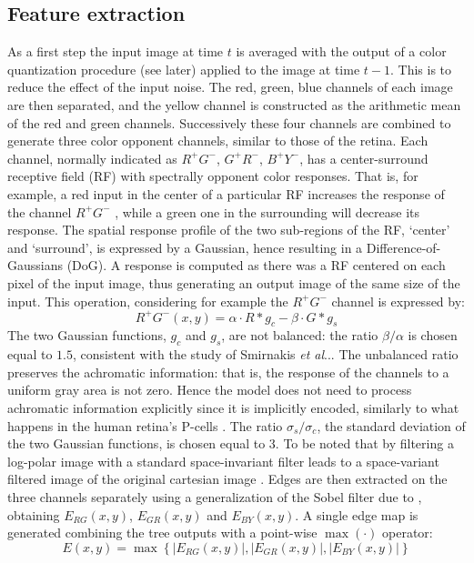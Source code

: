 \documentclass{llncs}
\makeatletter
\DeclareRobustCommand\onedot{\futurelet\@let@token\@onedot}
\def\@onedot{\ifx\@let@token.\else.\null\fi\xspace}
\def\etal{\emph{et al}\onedot}
\makeatother
\begin{document}
\subsection{Feature extraction}
As a first step the input image at time $t$ is averaged
with the output of a color quantization procedure (see
later) applied to the image at time $t-1$. This is to reduce
the effect of the input noise. The red, green, blue
channels of each image are then separated, and the
yellow channel is constructed as the arithmetic mean
of the red and green channels. Successively these four
channels are combined to generate three color
opponent channels, similar to those of the retina. Each
channel, normally indicated as $R^+G^-$, $G^+R^-$, $B^+ Y^-$,
has a center-surround receptive field (RF) with
spectrally opponent color responses. That is, for
example, a red input in the center of a particular RF
increases the response of the channel $R^+G^-$ , while a
green one in the surrounding will decrease its
response. The spatial response profile of the two sub-regions
of the RF, `center' and `surround', is expressed by a Gaussian,
hence resulting in a Difference-of-Gaussians (DoG).
A response is computed as there was a RF centered on
each pixel of the input image, thus generating an
output image of the same size of the input. This
operation, considering for example the $R^+G^-$ channel
is expressed by:
\begin{equation}
	R^+G^-(x,y)=\alpha \cdot R * g_c - \beta \cdot G * g_s
	\label{eq:dog}
\end{equation}
The two Gaussian functions, $g_c$ and $g_s$, are not
balanced: the ratio $\beta / \alpha$ is chosen equal to $1.5$,
consistent with the study of Smirnakis \etal \cite{SmirnakisBWBM97}. The
unbalanced ratio preserves the achromatic information:
that is, the response of the channels to a uniform gray
area is not zero. Hence the model does not need to
process achromatic information explicitly since it is
implicitly encoded, similarly to what happens in the
human retina's P-cells \cite{Billock95}. The ratio $\sigma_s / \sigma_c$, the
standard deviation of the two Gaussian functions, is
chosen equal to 3. To be noted that by filtering a log-polar
image with a standard space-invariant filter leads
to a space-variant filtered image of the original
cartesian image \cite{MallotSG90}.
Edges are then extracted on the three channels
separately using a generalization of the Sobel filter due
to \cite{LiYYY03}, obtaining $E_{RG}(x,y)$, $E_{GR}(x,y)$ and $E_{BY}(x,y)$. A
single edge map is generated combining the tree
outputs with a point-wise $\max(\cdot)$ operator:
\begin{equation}
	E(x,y)=\max\left\{\left|E_{RG}(x,y)\right|,\left|E_{GR}(x,y)\right|,\left|E_{BY}(x,y)\right|\right\}
	\label{eq:edge_map}
\end{equation}
\end{document}
